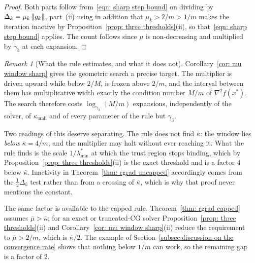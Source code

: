 \documentclass[11pt]{article}
\theoremstyle{plain}
\theoremstyle{definition}
\theoremstyle{remark}
\newtheorem{remark}[theorem]{Remark}
\numberwithin{equation}{section}
\newcommand*\mykappa[1]{\kappa_{\scriptscriptstyle\text{#1}}}
\newcommand{\Rgrad}{\textsf{R-grad}}
\providecommand{\gthree}{\gamma_3}
\providecommand{\kbar}{\overline{\kappa}}
\providecommand{\kbar}{\overline{\kappa}}
\begin{document}
\begin{proof}
    Both parts follow from~\eqref{eqn: sharp step bound} on dividing by
    $\Delta_k = \mu_k\left \lVert g_k \right \rVert$, part~(ii) using in addition that $\mu_k > 2/m > 1/m$ makes the
    iteration inactive by Proposition~\ref{prop: three thresholds}(ii), so
    that~\eqref{eqn: sharp step bound} applies. The count follows since $\mu$ is non-decreasing
    and multiplied by $\gthree$ at each expansion.
\end{proof}

\begin{remark}[What the rule estimates, and what it does not]
\label{rem: mu window sharp}
    Corollary~\ref{cor: mu window sharp} gives the geometric search a precise target. The
    multiplier is driven upward while below $2/M$, is frozen above $2/m$, and the interval between
    them has multiplicative width exactly the condition number $M/m$ of $\nabla^2 f(x^*)$. The
    search therefore costs $\log_{\gthree}(M/m)$ expansions, independently of the solver, of
    $\mykappa{umh}$ and of every parameter of the rule but $\gthree$.

    Two readings of this deserve separating. The rule does not find $\kbar$: the window lies
    \emph{below} $\kbar = 4/m$, and the multiplier may halt without ever reaching it. What the
    rule finds is the scale $1/\lambda^*_{\min}$ at which the trust region stops binding, which by
    Proposition~\ref{prop: three thresholds}(ii) is the exact threshold and is a factor $4$ below
    $\kbar$. Inactivity in Theorem~\ref{thm: rgrad uncapped} accordingly comes from the
    $\tfrac12\Delta_k$ test rather than from a crossing of $\kbar$, which is why that proof never
    mentions the constant.

    The same factor is available to the capped rule. Theorem~\ref{thm: rgrad capped} assumes
    $\overline{\mu} > \kbar$; for an exact or truncated-CG solver
    Proposition~\ref{prop: three thresholds}(ii) and
    Corollary~\ref{cor: mu window sharp}(ii) reduce the requirement to $\overline{\mu} > 2/m$,
    which is $\kbar/2$. The example of
    Section~\ref{subsec:discussion on the convergence rate} shows that nothing below $1/m$ can
    work, so the remaining gap is a factor of $2$.
\end{remark}

\end{document}
